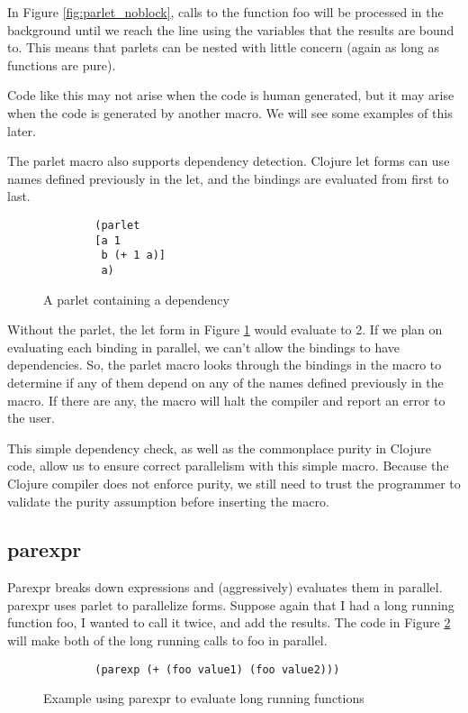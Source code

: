 \documentclass{sig-alternate}
\begin{document}
In Figure \ref{fig:parlet_noblock}, calls to the function foo will be processed in the background until we reach the line using the variables that the results are bound to.
This means that parlets can be nested with little concern (again as long as functions are pure).

Code like this may not arise when the code is human generated, but it may arise when the code is generated by another macro.
We will see some examples of this later.

The parlet macro also supports dependency detection.
Clojure let forms can use names defined previously in the let, and the bindings are evaluated from first to last.

\begin{figure}[h]
    \begin{verbatim}
        (parlet
        [a 1
         b (+ 1 a)]
         a)
    \end{verbatim}
    \caption{A parlet containing a dependency}
    \label{fig:parlet_dep}
\end{figure}

Without the parlet, the let form in Figure \ref{fig:parlet_dep} would evaluate to 2.
If we plan on evaluating each binding in parallel, we can't allow the bindings to have dependencies.
So, the parlet macro looks through the bindings in the macro to determine if any of them depend on
any of the names defined previously in the macro.
If there are any, the macro will halt the compiler and report an error to the user.

This simple dependency check, as well as the commonplace purity in Clojure code, allow us to ensure correct parallelism with this simple macro.
Because the Clojure compiler does not enforce purity, we still need to trust the programmer to validate the purity assumption before inserting the macro.

\subsection{parexpr}

Parexpr breaks down expressions and (aggressively) evaluates them in parallel.
parexpr uses parlet to parallelize forms.
Suppose again that I had a long running function foo, I wanted to call it twice, and add the results.
The code in Figure \ref{fig:parexpr} will make both of the long running calls to foo in parallel.

\begin{figure}[h]
    \begin{verbatim}
        (parexp (+ (foo value1) (foo value2)))
    \end{verbatim}
    \caption{Example using parexpr to evaluate long running functions}
    \label{fig:parexpr}
\end{figure}
\end{document}
